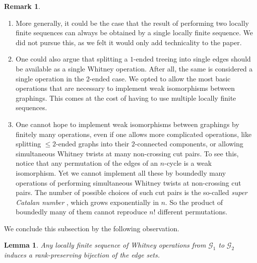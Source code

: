 \documentclass{article}
\theoremstyle{plain}
\newtheorem{lem}[thm]{Lemma}
\theoremstyle{definition}
\newtheorem{rem}[thm]{Remark}
\newcommand{\cG}{\mathcal{G}}
\begin{document}
\begin{rem}
\begin{enumerate}
    \item More generally, it could be the case that the result of performing two locally finite sequences can always be obtained by a single locally finite sequence. We did not pursue this, as we felt it would only add technicality to the paper. 

    \item One could also argue that splitting a $1$-ended treeing into single edges should be available as a single Whitney operation. After all, the same is considered a single operation in the 2-ended case. We opted to allow the most basic operations that are necessary to implement weak isomorphisms between graphings. This comes at the cost of having to use multiple locally finite sequences. 
    
    \item One cannot hope to implement weak isomorphisms between graphings by finitely many operations, even if one allows more complicated operations, like splitting $\leq2$-ended graphs into their $2$-connected components, or allowing simultaneous Whitney twists at many non-crossing cut pairs. To see this, notice that any permutation of the edges of an $n$-cycle is a weak isomorphism. Yet we cannot implement all these by boundedly many operations of performing simultaneous Whitney twists at non-crossing cut pairs. The number of possible choices of such cut pairs is the so-called \emph{super Catalan number} \cite{oeisA001003}, which grows exponentially in $n$. So the product of boundedly many of them cannot reproduce $n!$ different permutations. 
\end{enumerate}
\end{rem}
We conclude this subsection by the following observation. 

\begin{lem} \label{lem:locally_finite_sequence_gives_weak_isom}
    Any locally finite sequence of Whitney operations from $\cG_1$ to $\cG_2$ induces a rank-preserving bijection of the edge sets.  
\end{lem}
\end{document}

